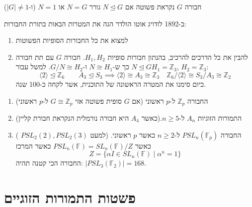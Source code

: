 \documentclass{tstextbook}
\begin{document}
\begin{definition}
חבורה \(G\) נקראת פשוטה אם \(N\trianglelefteq G\) גורר \(N=G\) או \(N=1\) (ו-\(|G|\neq 1\))

\end{definition}
\begin{definition}
ב-1892 לודויג אוטו הולדר הגה את המטרות הבאות בתורת החבורות:

  \begin{enumerate}
    \item למצוא את כל החבורות הסופיות הפשוטות 


    \item להבין את כל הדרכים להרכיב, בהנתון חבורות סופיות \(H_{1},H_{2}\). חבורה \(G\) עם תת חבורה \(N\trianglelefteq G\) כך ש-\(N\cong H_{1}\) 
 ו-\(G / N \cong H_{2}\).
 למשל עבור\(H_{1}=\mathbb{Z} _3\), \(H_{2}=\mathbb{Z} _3\):
$$\langle 2\rangle \trianglelefteq \mathbb{Z} _{6}\qquad A_{3}\trianglelefteq S_{3}\implies \langle 2\rangle \cong A_{3}\cong\mathbb{Z} _{3}\quad \mathbb{Z} _{6} / \langle 2\rangle \cong S_{3} / A_{3} \cong \mathbb{Z} _{2}$$
כיום סימנו את המטרה הראשונה של התוכנית, אשר לקחה כ-100 שנה.


  \end{enumerate}
\end{definition}
\begin{example}
  \begin{enumerate}
    \item החבורה \(\mathbb{Z} _{p}\) ל-\(p\) ראשוני (אם \(G\) סופית פשוטה אזי \(G\cong\mathbb{Z} _p\) ל-\(p\) ראשוני) 


    \item התמורות הזוגיות \(A_{n}\) ל-\(n\geq 5\).(כאשר \(A_{4}\) היא חבורה נורמלית הנקראת חבורת קליין) 


    \item החבורה \(PSL_{n}\left( \mathbb{F}_{p} \right)\) ל-\(n\geq 2\) כאשר \(p\) ראשוני. (למעט \(PSL_{2}(2),PSL_{2}(3)\) ) כאשר \(PSL_{n}\left( \mathbb{F} \right)=SL_{n}\left( \mathbb{F} \right)/Z\) כאשר המרכז 
 $$Z=\{ \alpha I\in SL_{n}\left( \mathbb{F} \right)\mid \alpha^n=1 \}$$
 החבורה הכי קטנה תהיה: \(|PSL_{3}\left( \mathbb{F}_{2} \right)|=168\).


  \end{enumerate}
\end{example}
\section{פשטות התמורות הזוגיים}
\end{document}
